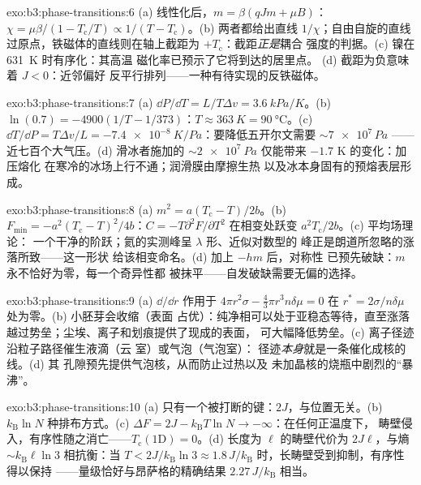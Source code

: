 \begin{solution}{exo:b3:phase-transitions:6}
(a) 线性化后，$m = \beta(qJm + \mu B)$：$\chi =
\mu\beta/(1 - T_{\text{c}}/T) \propto 1/(T - T_{\text{c}})$。(b)
两者都给出直线 $1/\chi$；自由自旋的直线
过原点，铁磁体的直线则在轴上截距为
$+T_{\text{c}}$：截距\emph{正是}耦合
强度的判据。(c) 镍在 \qty{631}{K} 时有序化：其高温
磁化率已预示了它将到达的居里点。
(d) 截距为负意味着 $J < 0$：近邻偏好
反平行排列——一种有待实现的反铁磁体。
\end{solution}

\begin{solution}{exo:b3:phase-transitions:7}
(a) $\dd P/\dd T = L/T\Delta v = \qty{3.6}{kPa/K}$。(b)
$\ln(0.7) = -4900(1/T - 1/373)$：$T \approx \qty{363}{K} =
\qty{90}{\celsius}$。(c) $\dd T/\dd P = T\Delta v/L =
\qty{-7.4e-8}{K/Pa}$：要降低五开尔文需要 $\sim\num{7e7}\,\unit{Pa}$
——近七百个大气压。(d) 滑冰者施加的
$\sim\qty{2e7}{Pa}$ 仅能带来 $-1.7$ K 的变化：加压熔化
在寒冷的冰场上行不通；润滑膜由摩擦生热
以及冰本身固有的预熔表层形成。
\end{solution}

\begin{solution}{exo:b3:phase-transitions:8}
(a) $m^2 = a(T_{\text{c}} - T)/2b$。(b) $F_{\min} =
-a^2(T_{\text{c}} - T)^2/4b$：$C = -T\partial^2F/\partial T^2$
在相变处跃变 $a^2T_{\text{c}}/2b$。(c) 平均场理论：
一个干净的阶跃；氦的实测峰呈 $\lambda$ 形、近似对数型的
峰正是朗道所忽略的涨落所致——这一形状
给该相变命名。(d) 加上 $-hm$ 后，对称性
已预先破缺：$m$ 永不恰好为零，每一个奇异性都
被抹平——自发破缺需要无偏的选择。
\end{solution}

\begin{solution}{exo:b3:phase-transitions:9}
(a) $\dd/\dd r$ 作用于 $4\pi r^2\sigma - \tfrac43\pi r^3n\delta\mu = 0$
在 $r^* = 2\sigma/n\delta\mu$ 处为零。(b) 小胚芽会收缩（表面
占优）：纯净相可以处于亚稳态等待，直至涨落
越过势垒；尘埃、离子和划痕提供了现成的表面，
可大幅降低势垒。(c) 离子径迹沿粒子路径催生液滴（云
室）或气泡（气泡室）：
径迹\emph{本身}就是一条催化成核的线。(d) 其
孔隙预先提供气泡核，从而防止过热以及
未加晶核的烧瓶中剧烈的“暴沸”。
\end{solution}

\begin{solution}{exo:b3:phase-transitions:10}
(a) 只有一个被打断的键：$2J$，与位置无关。(b)
$k_{\text{B}}\ln N$ 种排布方式。(c) $\Delta F = 2J -
k_{\text{B}}T\ln N \to -\infty$：在任何正温度下，
畴壁侵入，有序性随之消亡——$T_{\text{c}}(1\text{D}) = 0$。(d)
长度为 $\ell$ 的畴壁代价为 $2J\ell$，与熵
$\sim k_{\text{B}}\ell\ln3$ 相抗衡：当 $T < 2J/k_{\text{B}}\ln3 \approx
1.8\,J/k_{\text{B}}$ 时，长畴壁受到抑制，有序性得以保持
——量级恰好与昂萨格的精确结果
$2.27\,J/k_{\text{B}}$ 相当。
\end{solution}

